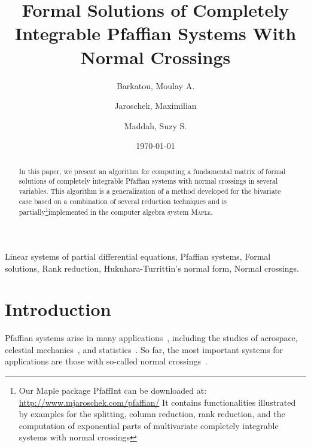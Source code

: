 \documentclass[final,1p,times,number,amsthm]{elsart}
\begin{document}
\begin{frontmatter}

\date{\today} \title{Formal Solutions of Completely Integrable Pfaffian Systems
  With Normal Crossings}

\author{Barkatou, Moulay A.}
\address{XLIM UMR 7252 , DMI, University of Limoges; CNRS\\
        123, Avenue Albert Thomas, 87060 Limoges, France\\
        \texttt{moulay.barkatou@unilim.fr}}

 \author{Jaroschek, Maximilian}
 \address{Max Planck Institute for Informatics,\\ Saarbruecken, Germany\\
  \texttt{maximilian@mjaroschek.com}}

\author{Maddah, Suzy S.}
\address{Fields Institute\\
  222 College St, Toronto, ON M5T 3J1 Ontario, Canada\\
  \texttt{suzy.maddah@inria.fr}}


\begin{abstract}
  In this paper, we present an algorithm for computing a fundamental matrix of
  formal solutions of completely integrable Pfaffian systems with normal
  crossings in several variables. This algorithm is a generalization of a method
  developed for the bivariate case based on a combination of several reduction
  techniques and is partially\footnote{Our Maple package PfaffInt can be
    downloaded at: \url{http://www.mjaroschek.com/pfaffian/} It contains
    functionalities illustrated by examples for the splitting, column reduction,
    rank reduction, and the computation of exponential parts of multivariate
    completely integrable systems with normal crossings}implemented in the
  computer algebra system \textsc{Maple}.
\end{abstract}

\begin{keyword}
  Linear systems of partial differential equations, Pfaffian systems, Formal
  solutions, Rank reduction, Hukuhara-Turrittin's normal form, Normal crossings.
\end{keyword}

\end{frontmatter}



\section{Introduction}
\label{sec:intro}
Pfaffian systems arise in many applications~\cite{key74}, including the studies
of aerospace, celestial mechanics~\cite{key31}, and
statistics~\cite{key3062}. So far, the most important systems for applications
are those with so-called normal crossings~\cite{key32}.
\end{document}
